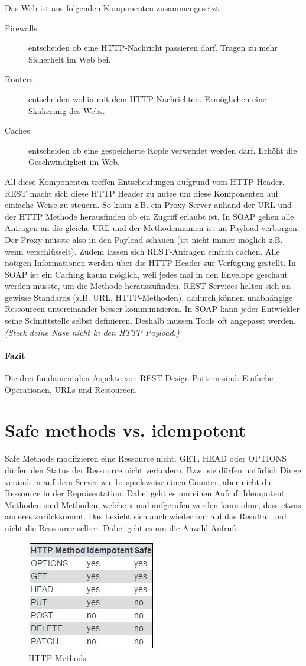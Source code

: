 Das Web ist aus folgenden Komponenten zusammengesetzt:
\begin{description}
	\item[Firewalls] entscheiden ob eine HTTP-Nachricht passieren darf. Tragen zu mehr Sicherheit im Web bei.
	\item[Routers] entscheiden wohin mit dem HTTP-Nachrichten. Ermöglichen eine Skalierung des Webs.
	\item[Caches] entscheiden ob eine gespeicherte Kopie verwendet werden darf. Erhöht die Geschwindigkeit im Web.
\end{description}
All diese Komponenten treffen Entscheidungen aufgrund vom HTTP Header. REST macht sich diese HTTP Header zu nutze um diese Komponenten auf einfache Weise zu steuern. So kann z.B. ein Proxy Server anhand der URL und der HTTP Methode herausfinden ob ein Zugriff erlaubt ist. In SOAP gehen alle Anfragen an die gleiche URL und der Methodennamen ist im Payload verborgen. Der Proxy müsste also in den Payload schauen (ist nicht immer möglich z.B. wenn verschlüsselt).
Zudem lassen sich REST-Anfragen einfach cachen. Alle nötigen Informationen werden über die HTTP Header zur Verfügung gestellt. In SOAP ist ein Caching kaum möglich, weil jedes mal in den Envelope geschaut werden müsste, um die Methode herauszufinden. 
REST Services halten sich an gewisse Standards (z.B. URL, HTTP-Methoden), dadurch können unabhängige Ressourcen untereinander besser kommunizieren. In SOAP kann jeder Entwickler seine Schnittstelle selbst definieren. Deshalb müssen Tools oft angepasst werden. \emph{(Steck deine Nase nicht in den HTTP Payload.)}

\paragraph{Fazit}
Die drei fundamentalen Aspekte von REST Design Pattern sind: Einfache Operationen, URLs und Ressourcen.

\section{Safe methods vs. idempotent}
Safe Methods modifzieren eine Ressource nicht. GET, HEAD oder OPTIONS dürfen den Status der Ressource nicht verändern. Bzw. sie dürfen natürlich Dinge verändern auf dem Server wie beispielsweise einen Counter, aber nicht die Ressource in der Repräsentation. Dabei geht es um einen Aufruf. Idempotent Methoden sind Methoden, welche x-mal aufgerufen werden kann ohne, dass etwas anderes zurückkommt. Das bezieht sich auch wieder nur auf das Resultat und nicht die Ressource selber. Dabei geht es um die Anzahl Aufrufe.

\begin{figure}[h!]
\centering
\includegraphics[width=0.5\linewidth]{fig/rest-methods}
\caption{HTTP-Methods}
\label{fig:rest-methods}
\end{figure}